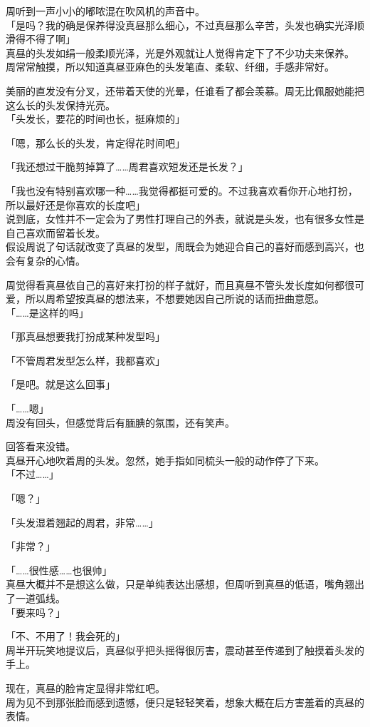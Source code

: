 周听到一声小小的嘟哝混在吹风机的声音中。\\

「是吗？我的确是保养得没真昼那么细心，不过真昼那么辛苦，头发也确实光泽顺滑得不得了啊」\\

真昼的头发如绢一般柔顺光泽，光是外观就让人觉得肯定下了不少功夫来保养。\\

周常常触摸，所以知道真昼亚麻色的头发笔直、柔软、纤细，手感非常好。

美丽的直发没有分叉，还带着天使的光晕，任谁看了都会羡慕。周无比佩服她能把这么长的头发保持光亮。\\

「头发长，要花的时间也长，挺麻烦的」

「嗯，那么长的头发，肯定得花时间吧」

「我还想过干脆剪掉算了……周君喜欢短发还是长发？」

「我也没有特别喜欢哪一种……我觉得都挺可爱的。不过我喜欢看你开心地打扮，所以最好还是你喜欢的长度吧」\\

说到底，女性并不一定会为了男性打理自己的外表，就说是头发，也有很多女性是自己喜欢而留着长发。\\

假设周说了句话就改变了真昼的发型，周既会为她迎合自己的喜好而感到高兴，也会有复杂的心情。

周觉得看真昼依自己的喜好来打扮的样子就好，而且真昼不管头发长度如何都很可爱，所以周希望按真昼的想法来，不想要她因自己所说的话而扭曲意愿。\\

「……是这样的吗」

「那真昼想要我打扮成某种发型吗」

「不管周君发型怎么样，我都喜欢」

「是吧。就是这么回事」

「……嗯」\\

周没有回头，但感觉背后有腼腆的氛围，还有笑声。

回答看来没错。\\

真昼开心地吹着周的头发。忽然，她手指如同梳头一般的动作停了下来。\\

「不过……」

「嗯？」

「头发湿着翘起的周君，非常……」

「非常？」

「……很性感……也很帅」\\

真昼大概并不是想这么做，只是单纯表达出感想，但周听到真昼的低语，嘴角翘出了一道弧线。\\

「要来吗？」

「不、不用了！我会死的」\\

周半开玩笑地提议后，真昼似乎把头摇得很厉害，震动甚至传递到了触摸着头发的手上。

现在，真昼的脸肯定显得非常红吧。\\

周为见不到那张脸而感到遗憾，便只是轻轻笑着，想象大概在后方害羞着的真昼的表情。
